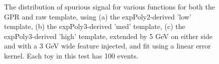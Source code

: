 \begin{figure} 
\begin{center}

\caption{The distribution of spurious signal for various functions for both the GPR and raw template, using (a) the expPoly2-derived 'low' template, (b) the expPoly3-derived 'med' template, (c) the expPoly3-derived 'high' template, extended by 5 GeV on either side and with a 3 GeV wide feature injected, and fit using a linear error kernel. Each toy in this test has 100 events.}
\label{fig:linearkernel_lowpt_100_Sig}
\end{center}
\end{figure}

